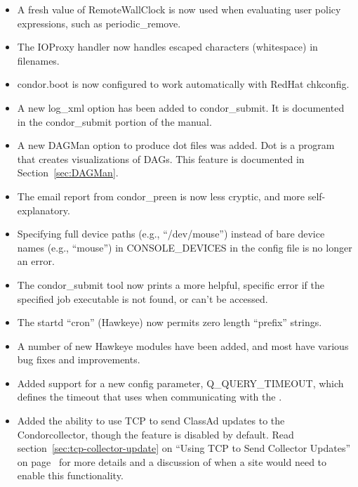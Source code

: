 \begin{itemize}

\item A fresh value of RemoteWallClock is now used when evaluating
user policy expressions, such as periodic\_remove.

\item The IOProxy handler now handles escaped characters (whitespace)
in filenames.

\item condor.boot is now configured to work automatically with RedHat
chkconfig.

\item A new log\_xml option has been added to condor\_submit. It is
documented in the condor\_submit portion of the manual.

\item A new DAGMan option to produce dot files was added. Dot is a
program that creates visualizations of DAGs. This feature is
documented in Section~\ref{sec:DAGMan}.

\item The email report from condor\_preen is now less cryptic, and
more self-explanatory.

\item Specifying full device paths (e.g., ``/dev/mouse'') instead of bare
device names (e.g., ``mouse'') in CONSOLE\_DEVICES in the config file is no
longer an error.

\item The condor\_submit tool now prints a more helpful, specific error if
the specified job executable is not found, or can't be accessed.

\item The startd ``cron'' (Hawkeye) now permits zero length ``prefix''
strings.

\item A number of new Hawkeye modules have been added, and most have
various bug fixes and improvements.

\item Added support for a new config parameter, Q\_QUERY\_TIMEOUT, which
defines the timeout that  uses when communicating with the
.

\item Added the ability to use TCP to send ClassAd updates to the
Condor{collector}, though the feature is disabled by default.
Read section~\ref{sec:tcp-collector-update} on ``Using TCP to Send
Collector Updates'' on page~\pageref{sec:tcp-collector-update} for
more details and a discussion of when a site would need to enable this 
functionality.

\end{itemize}

